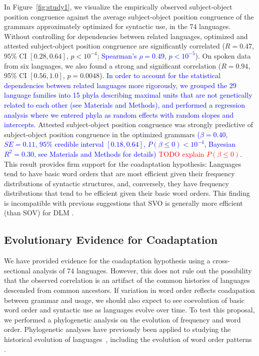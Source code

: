 \documentclass[9pt,twocolumn,twoside,lineno]{pnas-new}
\begin{document}
In Figure~\ref{fig:study1}, we visualize the empirically observed subject-object position congruence against the average subject-object position congruence of the grammars  approximately optimized for syntactic use, in the 74 languages.
Without controlling for dependencies between related languages, optimized and attested subject-object position congruence are significantly correlated ($R=0.47$, $95\%$ CI $[0.28, 0.64]$, $p<10^{-4}$; \textcolor{blue}{Spearman's $\rho=0.49$, $p < 10^{-5}$}). %
On spoken data from six languages, we also found a strong and significant correlation ($R=0.94$, 95\% CI $[0.56, 1.0]$, $p=0.0048$).
\textcolor{blue}{In order to account for the statistical dependencies between related languages more rigorously, we grouped the 29 language families into 15 phyla describing maximal units that are not genetically related to each other (see Materials and Methods), and performed a regression analysis where we entered phyla as random effects with random slopes and intercepts.}
Attested subject-object position congruence was strongly predictive of subject-object position congruence in the optimized grammars \textcolor{blue}{($\beta = 0.40$, $SE=0.11$, $95\%$ credible interval $[0.18, 0.64]$, $P(\beta\leq 0) < 10^{-4}$, Bayesian $R^2 = 0.30$, see Materials and Methods for details)} \textcolor{red}{TODO explain $P(\beta\leq 0)$}. %
This result provides firm support for the coadaptation hypothesis: Languages tend to have basic word orders that are most efficient given their frequency distributions of syntactic structures, and, conversely, they have frequency distributions that tend to be efficient given their basic word orders.
This finding is incompatible with previous suggestions that SVO is generally more efficient (than SOV) for DLM \citep{ferrer-i-cancho-placement-2017}.







\subsection*{Evolutionary Evidence for Coadaptation}
We have provided evidence for the coadaptation hypothesis using a cross-sectional analysis of 74 languages.
However, this does not rule out the possibility that the observed correlation is an artifact of the common histories of languages descended from common ancestors.
If variation in word order reflects coadapation between grammar and usage, we should also expect to see coevolution of basic word order and syntactic use as languages evolve over time.
To test this proposal, we performed a phylogenetic analysis on the evolution of frequency and word order.
Phylogenetic analyses have previously been applied to studying the historical evolution of languages~\citep[e.g., ][]{gray2009language,greenhill2009austronesian,chang2015ancestry,sagart2019dated}, including the evolution of word order patterns \citep{dunn-evolved-2011, maurits2014tracing}.
\end{document}
